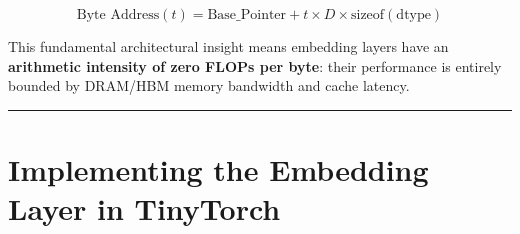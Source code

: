 \documentclass[
  letterpaper,
]{scrbook}
\begin{document}
\[\text{Byte Address}(t) = \text{Base\_Pointer} + t \times D \times \text{sizeof}(\text{dtype})\]

This fundamental architectural insight means embedding layers have an
\textbf{arithmetic intensity of zero FLOPs per byte}: their performance
is entirely bounded by DRAM/HBM memory bandwidth and cache latency.

\begin{center}\rule{0.5\linewidth}{0.5pt}\end{center}

\section{Implementing the Embedding Layer in
TinyTorch}\label{implementing-the-embedding-layer-in-tinytorch}
\end{document}
